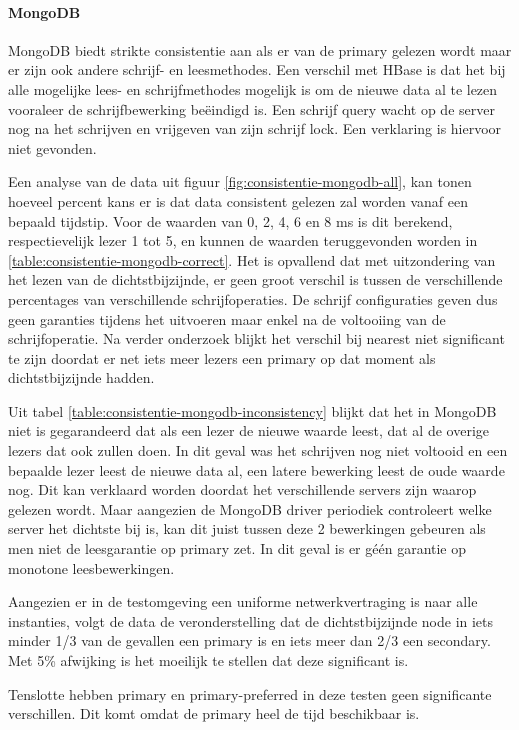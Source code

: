 \paragraph{MongoDB} MongoDB biedt strikte consistentie aan als er van de primary gelezen wordt maar er zijn ook andere schrijf- en leesmethodes. Een verschil met HBase is dat het bij alle mogelijke lees- en schrijfmethodes mogelijk is om de nieuwe data al te lezen vooraleer de schrijfbewerking beëindigd is. Een schrijf query wacht op de server nog na het schrijven en vrijgeven van zijn schrijf lock. Een verklaring is hiervoor niet gevonden.

Een analyse van de data uit figuur \ref{fig:consistentie-mongodb-all}, kan tonen hoeveel percent kans er is dat data consistent gelezen zal worden vanaf een bepaald tijdstip.  Voor de waarden van 0, 2, 4, 6 en 8 ms is dit berekend, respectievelijk lezer 1 tot 5,  en kunnen de waarden teruggevonden worden in \ref{table:consistentie-mongodb-correct}. Het is opvallend dat met uitzondering van het lezen van de dichtstbijzijnde, er geen groot verschil is tussen de verschillende percentages van verschillende schrijfoperaties. De schrijf configuraties geven dus geen garanties tijdens het uitvoeren maar enkel na de voltooiing van de schrijfoperatie.  Na verder onderzoek blijkt het verschil bij nearest niet significant te zijn doordat er net iets meer lezers een primary op dat moment als dichtstbijzijnde hadden. 

Uit tabel \ref{table:consistentie-mongodb-inconsistency} blijkt dat het in MongoDB niet is gegarandeerd dat als een lezer de nieuwe waarde leest, dat al de overige lezers dat ook zullen doen. In dit geval was het schrijven nog niet voltooid en een bepaalde lezer leest de nieuwe data al, een latere bewerking leest de oude waarde nog. Dit kan verklaard worden doordat het verschillende servers zijn waarop gelezen wordt. Maar aangezien de MongoDB driver periodiek controleert welke server het dichtste bij is, kan dit juist tussen deze 2 bewerkingen gebeuren als men niet de leesgarantie op primary zet. In dit geval is er géén garantie op monotone leesbewerkingen. 

Aangezien er in de testomgeving een uniforme netwerkvertraging is naar alle instanties, volgt de data de veronderstelling dat de dichtstbijzijnde node in iets minder 1/3 van de gevallen een primary is en iets meer dan 2/3 een secondary. Met 5\% afwijking is het moeilijk te stellen dat deze significant is. 

Tenslotte hebben primary en primary-preferred in deze testen geen significante verschillen. Dit komt omdat de primary heel de tijd beschikbaar is. 

